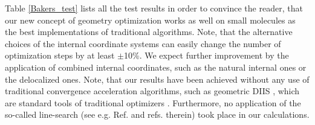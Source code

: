 \documentclass[prl,aps,twocolumn,showpacs,twocolumngrid,superbib]{revtex4}
\begin{document}
Table \ref{Bakers_test} lists all the test results
in order to convince
the reader, that our new concept of geometry optimization
works as well on small molecules as the best implementations
of traditional algorithms.
Note, that the alternative choices of the
internal coordinate systems can easily change the number
of optimization steps by at least $\pm$10\%.
We expect further improvement by the application of combined    
internal coordinates, such as the natural internal ones or the 
delocalized ones. 
Note, that our results have been achieved without any use
of traditional convergence acceleration algorithms, such as 
geometric DIIS \cite{Pulay_GDIIS}, which are standard tools of
traditional optimizers \cite{Farkas_GDIIS}. Furthermore, 
no application of the so-called line-search (see e.g. Ref. \cite{bakken}
and refs. therein) took place in our calculations.
\end{document}
